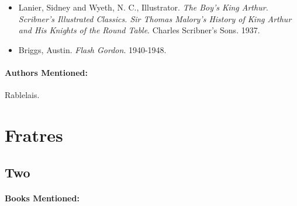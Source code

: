 \documentclass[12pt]{article}
\providecommand{\tightlist}{%
  \setlength{\itemsep}{0pt}\setlength{\parskip}{0pt}}
\begin{document}
\begin{itemize}
\tightlist
\item
  Lanier, Sidney and Wyeth, N. C., Illustrator. \emph{The Boy's King Arthur. Scribner's Illustrated Classics. Sir Thomas Malory's History of King Arthur and His Knights of the Round Table}. Charles Scribner's Sons. 1937.
\item
  Briggs, Austin. \emph{Flash Gordon}. 1940-1948.
\end{itemize}

\paragraph{Authors Mentioned:}\label{authors-mentioned-11}

Rablelais.

\section{Fratres}\label{fratres}

\subsection{Two}\label{two-1}

\paragraph{Books Mentioned:}\label{books-mentioned-16}
\end{document}
